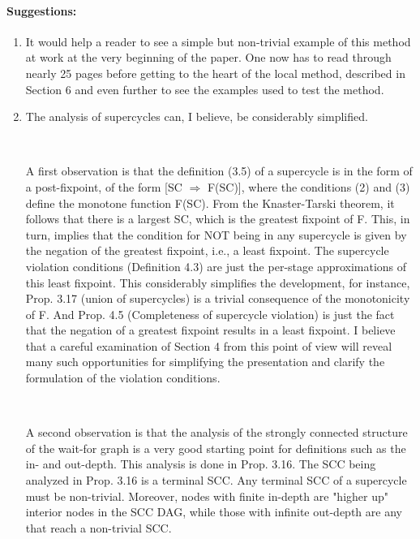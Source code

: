 \paragraph{Suggestions:}

\begin{enumerate}
\item It would help a reader to see a simple but non-trivial example of this method at work at the very beginning of the paper. One now has to read through nearly 25 pages before getting to the heart of the local method, described in Section 6 and even further to see the examples used to test the method.


\item The analysis of supercycles can, I believe, be considerably simplified.

~

  A first observation is that the definition (3.5) of a supercycle is in the form of a post-fixpoint, of the form [SC $\Rightarrow$ F(SC)],  where the conditions (2) and (3) define the monotone function F(SC). From the Knaster-Tarski theorem, it follows that there is a largest SC, which is the greatest fixpoint of F. This, in turn, implies that the condition for NOT being in any supercycle is given by the negation of the greatest fixpoint, i.e., a least fixpoint. The supercycle violation conditions (Definition 4.3) are just the per-stage approximations of this least fixpoint. This considerably simplifies the development, for instance, Prop. 3.17 (union of supercycles) is a trivial consequence of the monotonicity of F. And Prop. 4.5 (Completeness of supercycle violation) is just the fact that the negation of a greatest fixpoint results in a least fixpoint. I believe that a careful examination of Section 4 from this point of view will reveal many such opportunities for simplifying the presentation and clarify the formulation of the violation conditions.

~

  A second observation is that the analysis of the strongly connected structure of the wait-for graph is a very good starting point for definitions such as the in- and out-depth. This analysis is done in Prop. 3.16. The SCC being analyzed in Prop. 3.16 is a terminal SCC. Any terminal SCC of a supercycle must be non-trivial. Moreover, nodes with finite in-depth are "higher up" interior nodes in the SCC DAG, while those with infinite out-depth are any that reach a non-trivial SCC. 


\end{enumerate}

